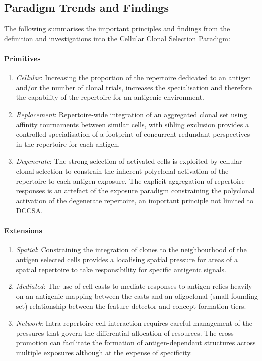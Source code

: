 %
%
\subsection{Paradigm Trends and Findings}
The following summarises the important principles and findings from the definition and investigations into the Cellular Clonal Selection Paradigm:

\paragraph{Primitives}
		\begin{enumerate}
			\item \emph{Cellular}: Increasing the proportion of the repertoire dedicated to an antigen and/or the number of clonal trials, increases the specialisation and therefore the capability of the repertoire for an antigenic environment.
			\item \emph{Replacement}: Repertoire-wide integration of an aggregated clonal set using affinity tournaments between similar cells, with sibling exclusion provides a controlled specialisation of a footprint of concurrent redundant perspectives in the repertoire for each antigen.
			\item \emph{Degenerate}: The strong selection of activated cells is exploited by cellular clonal selection to constrain the inherent polyclonal activation of the repertoire to each antigen exposure. The explicit aggregation of repertoire responses is an artefact of the exposure paradigm constraining the polyclonal activation of the degenerate repertoire, an important principle not limited to DCCSA.
		\end{enumerate}
		
\paragraph{Extensions}
		\begin{enumerate}
			\item \emph{Spatial}: Constraining the integration of clones to the neighbourhood of the antigen selected cells provides a localising spatial pressure for areas of a spatial repertoire to take responsibility for specific antigenic signals.
			\item \emph{Mediated}: The use of cell casts to mediate responses to antigen relies heavily on an antigenic mapping between the casts and an oligoclonal (small founding set) relationship between the feature detector and concept formation tiers.
			\item \emph{Network}: Intra-repertoire cell interaction requires careful management of the pressures that govern the differential allocation of resources. The cross promotion can facilitate the formation of antigen-dependant structures across multiple exposures although at the expense of specificity.
		\end{enumerate}
		
